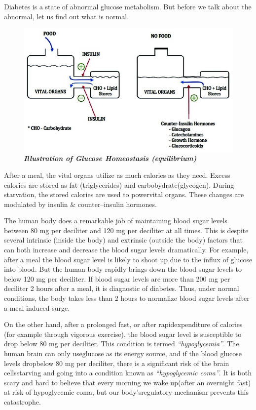 Diabetes is a state of abnormal glucose metabolism. But before we talk about the abnormal, let us find out what is normal.

\vskip 10pt

\begin{figure}[h]
\centering
\includegraphics[scale=2.5]{images/017.jpg}\\
\textit{\textbf{Illustration of Glucose Homeostasis (equilibrium)}}
\end{figure}

After a meal, the vital organs utilize as much calories as they need. Excess calories are stored as fat (triglycerides) and carbobydrate\break (glycogen). During starvation, the stored calories are used to power\break vital organs. These changes are modulated by insulin \& counter–insu\-lin hormones.

The human body does a remarkable job of maintaining blood sugar levels between 80 mg per deciliter and 120 mg per deciliter at all times.
 This is despite several intrinsic (inside the body) and extrinsic (outside the body) factors that can both increase and decrease the blood sugar levels dramatically. For example, after a meal the blood sugar level is likely to shoot up due to the influx of glucose into blood. But the human body rapidly brings down the blood sugar levels to below 120 mg per deciliter. If blood sugar levels are more than 200 mg per deciliter 2 hours after a meal, it is diagnostic of diabetes. Thus, under normal conditions, the body takes less than 2 hours to normalize blood sugar levels after a meal induced surge.

\vskip 6pt
On the other hand, after a prolonged fast, or after rapid\break expenditure of calories (for example through vigorous exercise), the blood sugar level is susceptible to drop below 80 mg per deciliter. This condi\-tion is termed \textit{“hypoglycemia”}. The human brain can only use\break glucose as its energy source, and if the blood glucose levels drop\break below 80 mg per deciliter, there is a significant risk of the brain cells\break star\-ving and going into a condition known as \textit{“hypoglycemic coma”}. It is both scary and hard to believe that every morning we wake up\break (after an overnight fast) at risk of hypoglycemic coma, but our body’s\break regulatory mechanism prevents this catastrophe.

